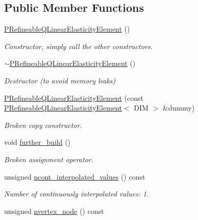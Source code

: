 \subsection*{Public Member Functions}
\begin{DoxyCompactItemize}
\item 
\hyperlink{classoomph_1_1PRefineableQLinearElasticityElement_a11d268420f81bc8c502f9b27a11f1b46}{P\+Refineable\+Q\+Linear\+Elasticity\+Element} ()
\begin{DoxyCompactList}\small\item\em Constructor, simply call the other constructors. \end{DoxyCompactList}\item 
\hyperlink{classoomph_1_1PRefineableQLinearElasticityElement_aac8e10be4a3bd519a5a33193c44d4695}{$\sim$\+P\+Refineable\+Q\+Linear\+Elasticity\+Element} ()
\begin{DoxyCompactList}\small\item\em Destructor (to avoid memory leaks) \end{DoxyCompactList}\item 
\hyperlink{classoomph_1_1PRefineableQLinearElasticityElement_a794f9fea54d1f53b15293ba460de7a7a}{P\+Refineable\+Q\+Linear\+Elasticity\+Element} (const \hyperlink{classoomph_1_1PRefineableQLinearElasticityElement}{P\+Refineable\+Q\+Linear\+Elasticity\+Element}$<$ D\+IM $>$ \&dummy)
\begin{DoxyCompactList}\small\item\em Broken copy constructor. \end{DoxyCompactList}\item 
void \hyperlink{classoomph_1_1PRefineableQLinearElasticityElement_a286182e34bade0d256482bed74e8e77f}{further\+\_\+build} ()
\begin{DoxyCompactList}\small\item\em Broken assignment operator. \end{DoxyCompactList}\item 
unsigned \hyperlink{classoomph_1_1PRefineableQLinearElasticityElement_abdaa00cf9884e4415933748aa2c19672}{ncont\+\_\+interpolated\+\_\+values} () const
\begin{DoxyCompactList}\small\item\em Number of continuously interpolated values\+: 1. \end{DoxyCompactList}\item 
unsigned \hyperlink{classoomph_1_1PRefineableQLinearElasticityElement_a1c3378ffd265b23eb9702a600742782b}{nvertex\+\_\+node} () const

\end{DoxyCompactItemize}
